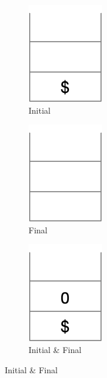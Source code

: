 \documentclass{article}
\begin{document}
\begin{figure}[h]
	\captionsetup[subfigure]{justification=centering}
	\hspace{0.17\textwidth}
	\begin{subfigure}[h]{0.1\textwidth}
		\includegraphics[scale=0.5]{Q2_epsilon}
			\caption{Initial}
	\end{subfigure}
\hspace{0.05\textwidth}
	\begin{subfigure}[h]{0.1\textwidth}
	\includegraphics[scale=0.5]{Q2_epsilon_final}
	\caption{Final}
	\end{subfigure}		
	\hspace{0.23\textwidth}
	\begin{subfigure}[h]{0.1\textwidth}
		\includegraphics[scale=0.5]{Q2_a}
		\caption{Initial \& Final}
	\end{subfigure}
\end{figure}
\end{document}
